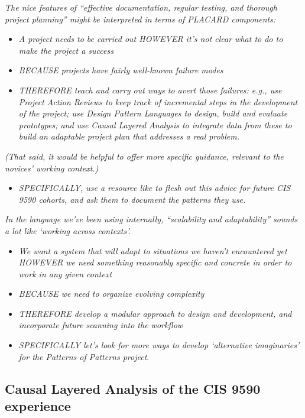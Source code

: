 \documentclass[acmlarge,timestamp]{acmart}
\begin{document}
\smallskip
\noindent \emph{The nice features of “effective documentation, regular testing, and thorough project planning” might be interpreted in terms of PLACARD components:}
\begin{itemize}
  \item \emph{A project needs to be carried out HOWEVER it’s not clear what to do to make the project a success}
  \item \emph{BECAUSE projects have fairly well-known failure modes}
  \item \emph{THEREFORE teach and carry out ways to avert those
  failures: e.g., use Project Action Reviews to keep track of
  incremental steps in the development of the project; use Design
  Pattern Languages to design, build and evaluate prototypes; and use
  Causal Layered Analysis to integrate data from these to build an
  adaptable project plan that addresses a real problem.}
\end{itemize}
\emph{(That said, it would be helpful to offer more specific guidance, relevant to the novices’ working context.)}
\begin{itemize}
\item \emph{SPECIFICALLY, use a resource like
\citet{hoover2009apprenticeship} to flesh out this advice for future
CIS 9590 cohorts, and ask them to document the patterns they use.}
\end{itemize}



\smallskip
\noindent \emph{In the language we’ve been using internally,
“scalability and adaptability” sounds a lot like ‘working across
contexts’.}
\begin{itemize}
  \item \emph{We want a system that will adapt to situations we haven’t encountered yet HOWEVER we need something reasonably specific and concrete in order to work in any given context}
  \item \emph{BECAUSE we need to organize evolving complexity}
  \item \emph{THEREFORE develop a modular approach to design and development, and incorporate future scanning into the workflow}
  \item \emph{SPECIFICALLY let’s look for more ways to develop ‘alternative imaginaries’ for the Patterns of Patterns project}.
\end{itemize}

\subsection{Causal Layered Analysis of the CIS 9590 experience}
\end{document}
